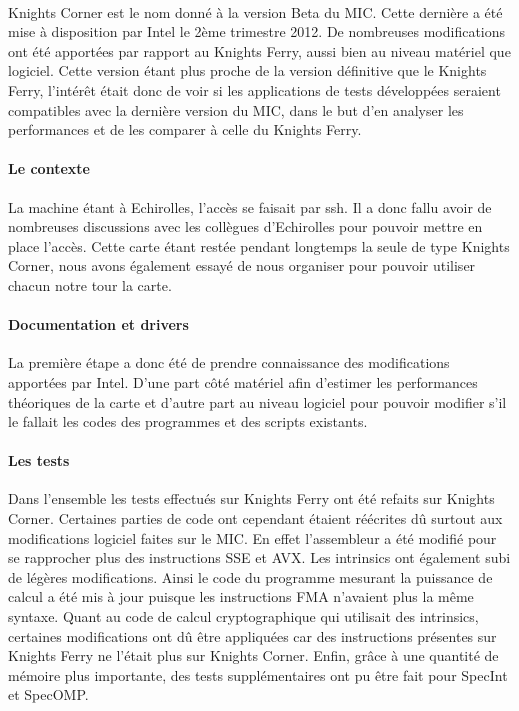 \documentclass[11pt]{article}
\begin{document}
				\paragraph{}
				Knights Corner est le nom donné à la version Beta du MIC. Cette dernière a été mise à disposition par Intel le 2ème trimestre 
				2012. De nombreuses modifications ont été apportées par rapport au Knights Ferry, aussi bien au niveau matériel que logiciel. 
				Cette version étant plus proche de la version définitive que le Knights Ferry, l'intérêt était donc de voir 
				si les applications de tests développées seraient compatibles avec la dernière version du MIC, dans le but d'en 
				analyser les performances et de les comparer à celle du Knights Ferry.
				\paragraph{Le contexte}
				La machine étant à Echirolles, l'accès se faisait par ssh. Il a donc fallu avoir de nombreuses discussions avec les collègues d'Echirolles 
				pour pouvoir mettre en place l'accès. Cette carte étant restée pendant longtemps la seule de type Knights Corner, nous avons également 
				essayé de nous organiser pour pouvoir utiliser chacun notre tour la carte.
				\paragraph{Documentation et drivers}
				La première étape a donc été de prendre connaissance des modifications apportées par Intel. D'une part côté 
				matériel afin d'estimer les performances théoriques de la carte et d'autre part au niveau logiciel pour pouvoir 
				modifier s'il le fallait les codes des programmes et des scripts existants.
				\paragraph{Les tests}
				Dans l'ensemble les tests effectués sur Knights Ferry ont été refaits sur Knights Corner. Certaines parties 
				de code ont cependant étaient réécrites dû surtout aux modifications logiciel faites sur le MIC. En effet l'assembleur 
				a été modifié pour se rapprocher plus des instructions SSE et AVX. Les intrinsics ont également subi de légères 
				modifications. \newline
				Ainsi le code du programme mesurant la puissance de calcul a été mis à jour puisque les instructions FMA n'avaient plus la même
				syntaxe. Quant au code de calcul cryptographique qui utilisait des intrinsics, certaines modifications ont dû être 
				appliquées car des instructions présentes sur Knights Ferry ne l'était plus sur Knights Corner. Enfin, grâce à 
				une quantité de mémoire plus importante, des tests supplémentaires ont pu être fait pour SpecInt et SpecOMP.
\end{document}
